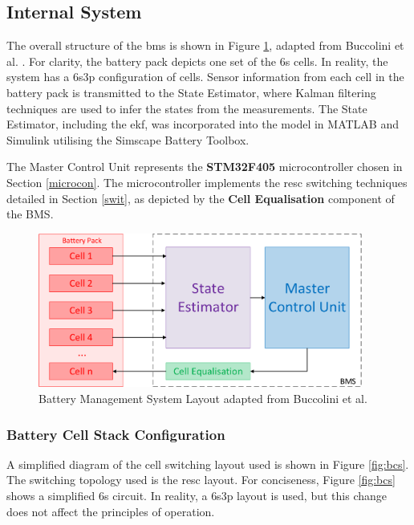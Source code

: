 \subsection{Internal System}

The overall structure of the \acrshort{bms} is shown in Figure \ref{fig:bms_layout}, adapted from Buccolini et al. \cite{7555475}. For clarity, the battery pack depicts one set of the \acrshort{6s} cells. In reality, the system has a \acrshort{6s3p} configuration of cells. Sensor information from each cell in the battery pack is transmitted to the State Estimator, where Kalman filtering techniques are used to infer the states from the measurements. The State Estimator, including the \gls{ekf}, was incorporated into the model in MATLAB and Simulink utilising the Simscape Battery Toolbox.

The Master Control Unit represents the \textbf{STM32F405} microcontroller chosen in Section \ref{microcon}. The microcontroller implements the \gls{resc} switching techniques detailed in Section \ref{swit}, as depicted by the \textbf{Cell Equalisation} component of the BMS.

\begin{figure}[H]
  \centering
  \vspace{5mm}
  \includegraphics[width=0.95\textwidth]{figs/Samuel/Figures/BMS Internal (1)-cropped.pdf}
  \caption[Battery Management System Layout]{Battery Management System Layout adapted from Buccolini et al. \cite{7555475}}
  \label{fig:bms_layout}
\end{figure}






\subsubsection{Battery Cell Stack Configuration}

A simplified diagram of the cell switching layout used is shown in Figure \ref{fig:bcs}. The switching topology used is the \gls{resc} layout. For conciseness, Figure \ref{fig:bcs} shows a simplified \gls{6s} circuit. In reality, a \gls{6s3p} layout is used, but this change does not affect the principles of operation. 

